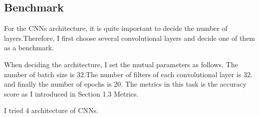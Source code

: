 \subsection{Benchmark}

For the CNNs architecture, it is quite important to decide the number of layers.Therefore, I first choose several convolutional layers and decide one of them as a benchmark.

When deciding the architecture, I set the mutual parameters as follows.
The number of batch size is 32.The number of filters of each convolutional layer is 32. and finally the number of epochs is 20. The metrics in this task is the accuracy score as I introduced in Section 1.3 Metrics.

I tried 4 architecture of CNNs.

